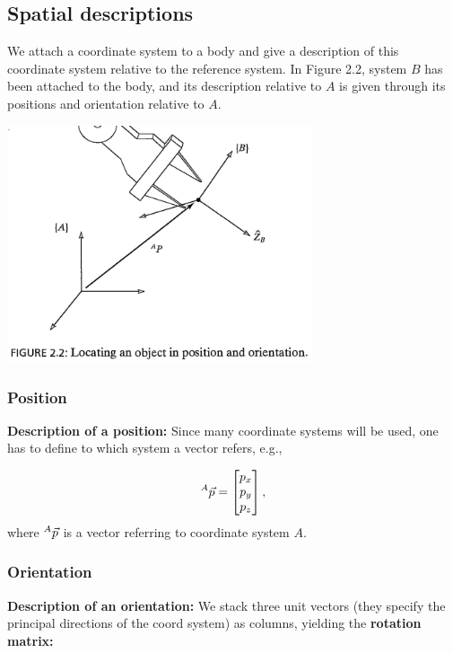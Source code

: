 \subsection{Spatial descriptions}

We attach a coordinate system to a body and give a description of this coordinate system relative to the reference system. In Figure 2.2, system $B$ has been attached to the body, and its description relative to $A$ is given through its positions and orientation relative to $A$. 

\begin{center}
	\includegraphics[width=9cm]{sections/imgs/2.png}
\end{center}

\subsubsection{Position}
\textbf{Description of a position:} Since many coordinate systems will be used, one has to define to which system a vector refers, e.g.,

\[^{A}\vect{p} = 
	\begin{bmatrix} p_x\\p_y\\p_z \end{bmatrix}, \] where $^{A}\vect{p}$ is a vector referring to coordinate system $A$.

\subsubsection{Orientation}
\textbf{Description of an orientation:} 
We stack three unit vectors (they specify the principal directions of the coord system) as columns, yielding the \textbf{rotation matrix:} 

